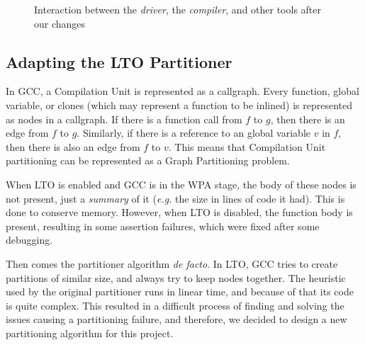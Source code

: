\documentclass[runningheads]{llncs}
\begin{document}
\begin{figure}
{{
}
}%
\caption{Interaction between the \textit{driver}, the \textit{compiler}, and other tools
after our changes}
\label{fig:gnu_toolchain_patched}
\end{figure}

\subsection{Adapting the LTO Partitioner}\label{sec:lto_partitioner}

In GCC, a Compilation Unit is represented as a callgraph. Every function,
global variable, or clones (which may represent a function to be inlined)
is represented as nodes in a callgraph. If there is a function call from $f$
to $g$, then there is an edge from $f$ to $g$. Similarly, if there is a
reference to an global variable $v$ in $f$, then there is also an edge from $f$
to $v$. This means that Compilation Unit partitioning can be represented as
a Graph Partitioning problem. 

When LTO is enabled and GCC is in the WPA stage, the body of these nodes
is not present, just a \textit{summary} of it (\textit{e.g.} the size
in lines of code it had). This is done to conserve memory. However,
when LTO is disabled, the function body is present, resulting
in some assertion failures, which were fixed after some debugging.

Then comes the partitioner algorithm \textit{de facto}. In LTO, GCC tries to
create partitions of similar size, and always try to keep nodes together. The
heuristic used by the original partitioner runs in linear time, and because of
that its code is quite complex. This resulted in a difficult process of finding
and solving the issues causing a partitioning failure, and therefore, we
decided to design a new partitioning algorithm for this project.
\end{document}
